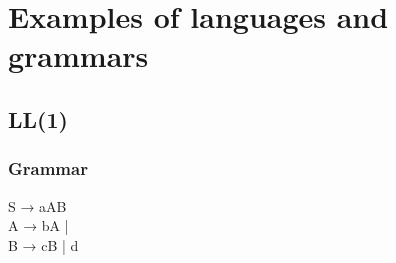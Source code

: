 \section{Examples of languages and grammars}

\subsection{LL(1)}
\subsubsection{Grammar}
S → aAB\\
A → bA | \epsilon\\
B → cB | d







